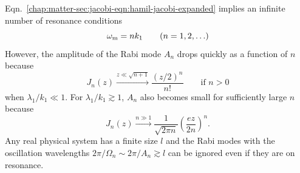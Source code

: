 Eqn.~\eqref{chap:matter-sec:jacobi-eqn:hamil-jacobi-expanded} implies an infinite number of resonance conditions
\begin{equation}
    \omega_\mm  = n k_1 \qquad (n=1, 2, \ldots)
    \label{chap:matter-sec:single-revisted-eqn:resonance-condition}
\end{equation}
However, the amplitude of the Rabi mode $A_n$ drops quickly as a function of $n$ because
\begin{equation}
    J_n(z) \xrightarrow{z\ll \sqrt{n+1}} \frac{ (z/2)^n }{n!} \qquad \text{if } n>0
    \label{chap:matter-sec:single-revisit-eqn:bessel-small-arg}
\end{equation}
when $\lambda_1/k_1 \ll 1$. For $\lambda_1/k_1\gtrsim 1$, $A_n$ also becomes small for sufficiently large $n$ because
\begin{equation}
    J_n(z) \xrightarrow{n\gg 1} \frac{1}{\sqrt{2\pi n}} \left( \frac{ e z }{ 2n } \right)^n.
\end{equation}
Any real physical system has a finite size $l$ and the Rabi modes with the oscillation wavelengths $2\pi/\Omega_n\sim 2\pi/A_n  \gtrsim l$ can be ignored even if they are on resonance.





